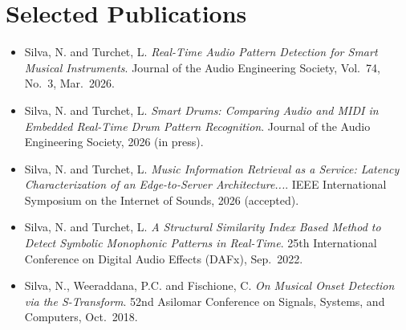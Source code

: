 \documentclass[11pt]{article}
\begin{document}

\section*{Selected Publications \footnotesize {}}
\begin{itemize}[leftmargin=1.2em, itemsep=-0.25em]
    \item Silva, N. and Turchet, L. \textit{Real-Time Audio Pattern Detection for Smart Musical Instruments}. Journal of the Audio Engineering Society, Vol.~74, No.~3, Mar.~2026.
    \item Silva, N. and Turchet, L. \textit{Smart Drums: Comparing Audio and MIDI in Embedded Real-Time Drum Pattern Recognition}. Journal of the Audio Engineering Society, 2026 (in press).
    \item Silva, N. and Turchet, L. \textit{Music Information Retrieval as a Service: Latency Characterization of an Edge-to-Server Architecture...}. IEEE International Symposium on the Internet of Sounds, 2026 (accepted).
    \item Silva, N. and Turchet, L. \textit{A Structural Similarity Index Based Method to Detect Symbolic Monophonic Patterns in Real-Time}. 25th International Conference on Digital Audio Effects (DAFx), Sep.~2022. 
    \item Silva, N., Weeraddana, P.C. and Fischione, C. \textit{On Musical Onset Detection via the S-Transform}. 52nd Asilomar Conference on Signals, Systems, and Computers, Oct.~2018.
\end{itemize}

\end{document}
